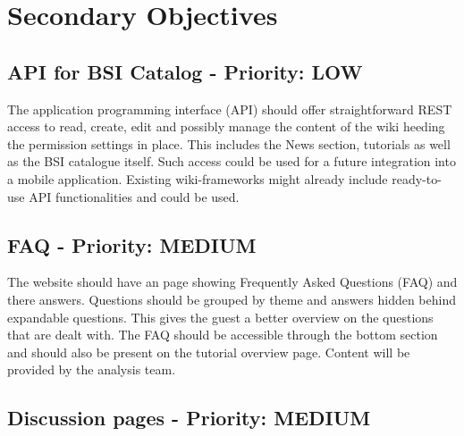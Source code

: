 \chapter{Secondary Objectives}
\section{API for BSI Catalog - Priority: LOW}
The application programming interface (API) should offer straightforward REST access to read, create, edit and possibly manage the content of the wiki heeding the permission settings in place.
This includes the News section, tutorials as well as the BSI catalogue itself.
Such access could be used for a future integration into a mobile application.
Existing wiki-frameworks might already include ready-to-use API functionalities and could be used.


\section{FAQ - Priority: MEDIUM}



\begin{tcolorbox}[breakable,colback=red!14,colframe=red!40!black,title=UPDATE 19/11/2017]
The website should have an page showing Frequently Asked Questions (FAQ) and there answers.
Questions should be grouped by theme and answers hidden behind expandable questions. 
This gives the guest a better overview on the questions that are dealt with.
The FAQ should be accessible through the bottom section and should also be present on the tutorial overview page.
Content will be provided by the analysis team.
\end{tcolorbox}

\section{Discussion pages - Priority: MEDIUM}
